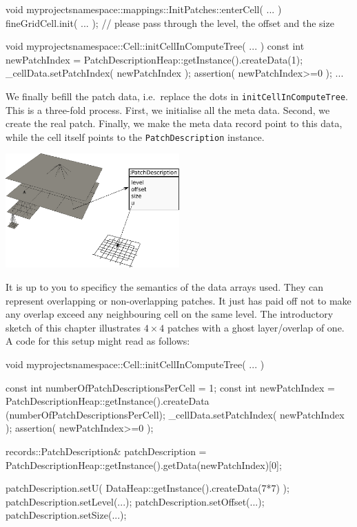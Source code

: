 \begin{code}
void myprojectsnamespace::mappings::InitPatches::enterCell(
  ...
) {
  fineGridCell.init( ... ); // please pass through the level, the offset and the size
}


void myprojectsnamespace::Cell::initCellInComputeTree( ... ) {
  const int newPatchIndex = PatchDescriptionHeap::getInstance().createData(1);
  _cellData.setPatchIndex( newPatchIndex );
  assertion( newPatchIndex>=0 );
  ...
}

\end{code}

\noindent
We finally befill the patch data, i.e.~replace the dots in
\texttt{initCellInComputeTree}.
This is a three-fold process.
First, we initialise all the meta data.
Second, we create the real patch. 
Finally, we make the meta data record point to this data, while 
the cell itself points to the \texttt{PatchDescription} instance.
 
\begin{center}
  \includegraphics[width=0.5\textwidth]{44_patch-based-solver/data.pdf}
\end{center}

\noindent
It is up to you to specificy the semantics of the data arrays used. 
They can represent overlapping or non-overlapping patches.
It just has paid off not to make any overlap exceed any neighbouring cell on the
same level.
The introductory sketch of this chapter illustrates $4\times 4$ patches with a
ghost layer/overlap of one. 
A code for this setup might read as follows:

\begin{code}
void myprojectsnamespace::Cell::initCellInComputeTree( ... ) {
  const int numberOfPatchDescriptionsPerCell = 1;
  const int newPatchIndex = PatchDescriptionHeap::getInstance().createData
    (numberOfPatchDescriptionsPerCell);
  _cellData.setPatchIndex( newPatchIndex );
  assertion( newPatchIndex>=0 );

  records::PatchDescription&  patchDescription =
    PatchDescriptionHeap::getInstance().getData(newPatchIndex)[0]; 
  
  patchDescription.setU( DataHeap::getInstance().createData(7*7) );
  patchDescription.setLevel(...);
  patchDescription.setOffset(...);
  patchDescription.setSize(...);
}

\end{code}


